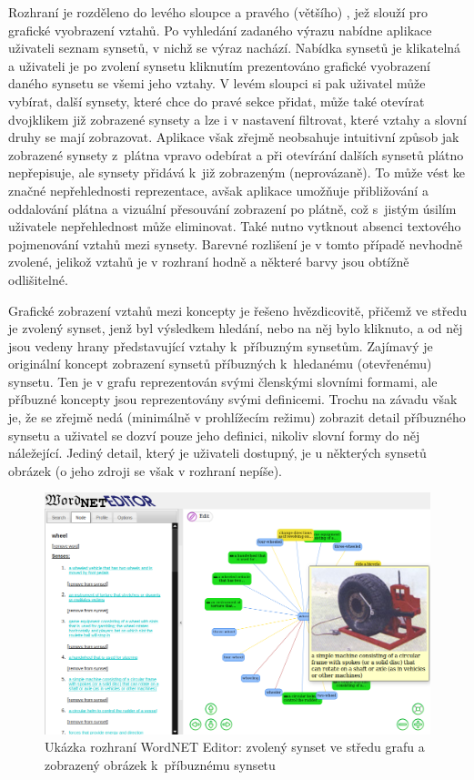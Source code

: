 \documentclass[a4paper, 11pt, oneside, showtrims]{book}
\begin{document}
					Rozhraní je rozděleno do levého sloupce a pravého (většího) , jež slouží pro grafické vyobrazení vztahů. Po vyhledání zadaného výrazu nabídne aplikace uživateli seznam synsetů, v nichž se výraz nachází. Nabídka synsetů je klikatelná a uživateli je po zvolení synsetu kliknutím prezentováno grafické vyobrazení daného synsetu se všemi jeho vztahy. V levém sloupci si pak uživatel může vybírat, další synsety, které chce do pravé sekce přidat, může také otevírat dvojklikem již zobrazené synsety a lze i v nastavení filtrovat, které vztahy a slovní druhy se mají zobrazovat. Aplikace však zřejmě neobsahuje intuitivní způsob jak zobrazené synsety z~plátna vpravo odebírat a při otevírání dalších synsetů plátno nepřepisuje, ale synsety přidává k~již zobrazeným (neprovázaně). To může vést ke značné nepřehlednosti reprezentace, avšak aplikace umožňuje přibližování a oddalování plátna a vizuální přesouvání zobrazení po plátně, což s~jistým úsilím uživatele nepřehlednost může eliminovat. Také nutno vytknout absenci textového pojmenování vztahů mezi synsety. Barevné rozlišení je v tomto případě nevhodně zvolené, jelikož vztahů je v rozhraní hodně a některé barvy jsou obtížně odlišitelné.

					Grafické zobrazení vztahů mezi koncepty je řešeno hvězdicovitě, přičemž ve středu je zvolený synset, jenž byl výsledkem hledání, nebo na něj bylo kliknuto, a od něj jsou vedeny hrany představující vztahy k~příbuzným synsetům. Zajímavý je originální koncept zobrazení synsetů příbuzných k~hledanému (otevřenému) synsetu. Ten je v grafu reprezentován svými členskými slovními formami, ale příbuzné koncepty jsou reprezentovány svými definicemi. Trochu na závadu však je, že se zřejmě nedá (minimálně v prohlížecím režimu) zobrazit detail příbuzného synsetu a uživatel se dozví pouze jeho definici, nikoliv slovní formy do něj náležející. Jediný detail, který je uživateli dostupný, je u některých synsetů obrázek (o jeho zdroji se však v rozhraní nepíše).

					\begin{figure}[h]
						\centering
						\includegraphics[width=1.0\textwidth]{wneditor.png}
						\caption{Ukázka rozhraní WordNET Editor: zvolený synset ve středu grafu a zobrazený obrázek k~příbuznému synsetu}
						\label{fig:wneditor}
					\end{figure}
\end{document}
